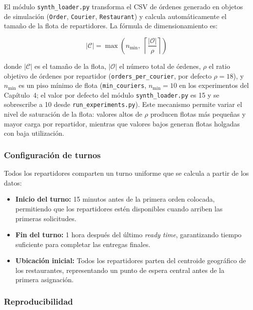 \documentclass[12pt,letterpaper,oneside]{book}
\begin{document}
	El módulo \texttt{synth\_loader.py} transforma el CSV de órdenes generado en objetos de 
	simulación (\texttt{Order}, \texttt{Courier}, \texttt{Restaurant}) y calcula automáticamente 
	el tamaño de la flota de repartidores. La fórmula de dimensionamiento es:

	\begin{equation}
		|\mathcal{C}| = \max\!\left(n_{\min}, \; \left\lceil \frac{|\mathcal{O}|}{\rho} \right\rceil\right)
		\label{eq:fleet_sizing}
	\end{equation}

	\noindent donde $|\mathcal{C}|$ es el tamaño de la flota, $|\mathcal{O}|$ el número total de
	órdenes, $\rho$ el ratio objetivo de órdenes por repartidor
	(\texttt{orders\_per\_courier}, por defecto $\rho = 18$), y $n_{\min}$ es un
	piso mínimo de flota (\texttt{min\_couriers}, $n_{\min} = 10$ en los experimentos del
	Capítulo~4; el valor por defecto del módulo \texttt{synth\_loader.py} es 15 y
	se sobrescribe a 10 desde \texttt{run\_experiments.py}). Este mecanismo
	permite variar el nivel de saturación de la flota: valores altos de $\rho$ producen
	flotas más pequeñas y mayor carga por repartidor, mientras que valores bajos generan flotas 
	holgadas con baja utilización.

	\subsubsection{Configuración de turnos}

	Todos los repartidores comparten un turno uniforme que se calcula a partir de los datos:

	\begin{itemize}
		\item \textbf{Inicio del turno:} 15 minutos antes de la primera orden colocada, 
		permitiendo que los repartidores estén disponibles cuando arriben las primeras solicitudes.
		
		\item \textbf{Fin del turno:} 1 hora después del último \textit{ready time}, 
		garantizando tiempo suficiente para completar las entregas finales.
		
		\item \textbf{Ubicación inicial:} Todos los repartidores parten del centroide geográfico 
		de los restaurantes, representando un punto de espera central antes de la primera 
		asignación.
	\end{itemize}

	\subsubsection{Reproducibilidad}
\end{document}
